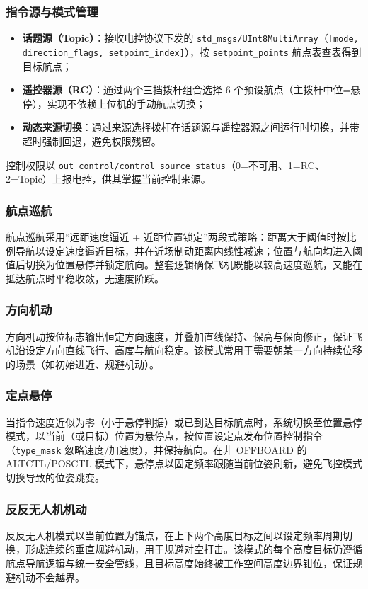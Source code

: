 \subsubsection{指令源与模式管理}
\begin{itemize}
    \item \textbf{话题源（Topic）}：接收电控协议下发的 \lstinline{std_msgs/UInt8MultiArray}（\lstinline{[mode, direction_flags, setpoint_index]}），按 \lstinline{setpoint_points} 航点表查表得到目标航点；
    \item \textbf{遥控器源（RC）}：通过两个三挡拨杆组合选择 6 个预设航点（主拨杆中位=悬停），实现不依赖上位机的手动航点切换；
    \item \textbf{动态来源切换}：通过来源选择拨杆在话题源与遥控器源之间运行时切换，并带超时强制回退，避免权限残留。
\end{itemize}
控制权限以 \lstinline{out_control/control_source_status}（0=不可用、1=RC、2=Topic）上报电控，供其掌握当前控制来源。

\subsubsection{航点巡航}
航点巡航采用“远距速度逼近 + 近距位置锁定”两段式策略：距离大于阈值时按比例导航以设定速度逼近目标，并在近场制动距离内线性减速；位置与航向均进入阈值后切换为位置悬停并锁定航向。整套逻辑确保飞机既能以较高速度巡航，又能在抵达航点时平稳收敛，无速度阶跃。

\subsubsection{方向机动}
方向机动按位标志输出恒定方向速度，并叠加直线保持、保高与保向修正，保证飞机沿设定方向直线飞行、高度与航向稳定。该模式常用于需要朝某一方向持续位移的场景（如初始进近、规避机动）。

\subsubsection{定点悬停}
当指令速度近似为零（小于悬停判据）或已到达目标航点时，系统切换至位置悬停模式，以当前（或目标）位置为悬停点，按位置设定点发布位置控制指令（\lstinline{type_mask} 忽略速度/加速度），并保持航向。在非 OFFBOARD 的 ALTCTL/POSCTL 模式下，悬停点以固定频率跟随当前位姿刷新，避免飞控模式切换导致的位姿跳变。

\subsubsection{反反无人机机动}
反反无人机模式以当前位置为锚点，在上下两个高度目标之间以设定频率周期切换，形成连续的垂直规避机动，用于规避对空打击。该模式的每个高度目标仍遵循航点导航逻辑与统一安全管线，且目标高度始终被工作空间高度边界钳位，保证规避机动不会越界。

